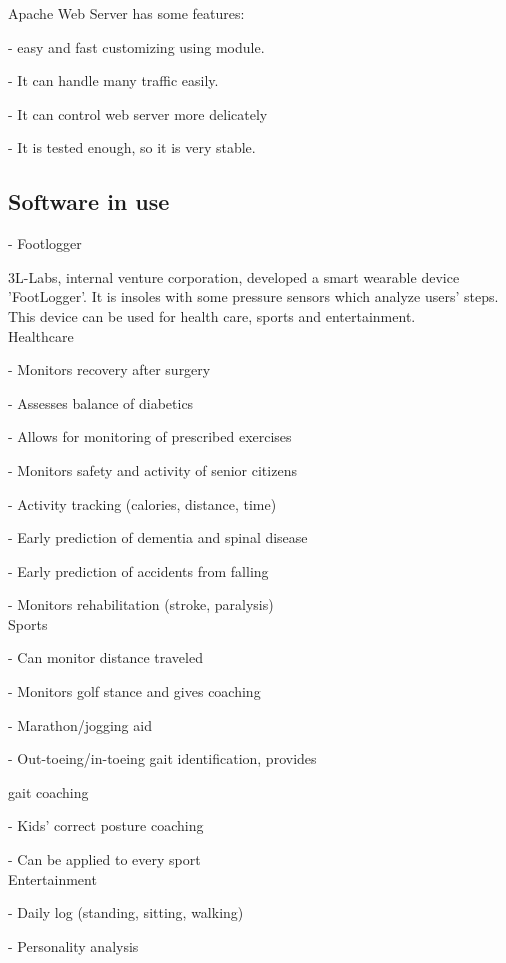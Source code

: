 \documentclass[conference]{IEEEtran}
\begin{document}
Apache Web Server has some features:

- easy and fast customizing using module.

- It can handle many traffic easily.

- It can control web server more delicately

- It is tested enough, so it is very stable.\\

\subsection{Software in use}

-	Footlogger

3L-Labs, internal venture corporation, developed a smart wearable device 'FootLogger'. It is insoles with some pressure sensors which analyze users' steps. This device can be used for health care, sports and entertainment.\\

Healthcare

- Monitors recovery after surgery

- Assesses balance of diabetics

- Allows for monitoring of prescribed exercises 

- Monitors safety and activity of senior citizens

- Activity tracking (calories, distance, time)

- Early prediction of dementia and spinal disease

- Early prediction of accidents from falling

- Monitors rehabilitation (stroke, paralysis)\\

Sports

- Can monitor distance traveled

- Monitors golf stance and gives coaching

- Marathon/jogging aid

- Out-toeing/in-toeing gait identification, provides 

gait coaching
 
- Kids' correct posture coaching

- Can be applied to every sport\\

Entertainment

-  Daily log (standing, sitting, walking)

-  Personality analysis
\end{document}
